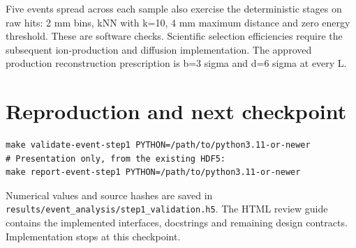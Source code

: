 \documentclass[11pt]{article}
\begin{document}
Five events spread across each sample also exercise the deterministic stages
on raw hits: 2 mm bins, kNN with k=10, 4 mm maximum distance and zero energy
threshold. These are software checks. Scientific selection efficiencies require
the subsequent ion-production and diffusion implementation. The approved
production reconstruction prescription is b=3 sigma and d=6 sigma at every L.

\section*{Reproduction and next checkpoint}
\begin{verbatim}
make validate-event-step1 PYTHON=/path/to/python3.11-or-newer
# Presentation only, from the existing HDF5:
make report-event-step1 PYTHON=/path/to/python3.11-or-newer
\end{verbatim}
Numerical values and source hashes are saved in
\texttt{results/event\_analysis/step1\_validation.h5}.
The HTML review guide contains the implemented interfaces, docstrings and
remaining design contracts. Implementation stops at this checkpoint.
\end{document}
